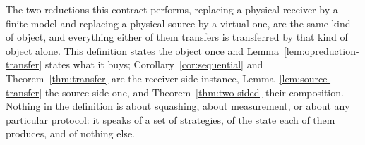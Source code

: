 
The two reductions this contract performs, replacing a physical receiver by a
finite model and replacing a physical source by a virtual one, are the same
kind of object, and everything either of them transfers is transferred by that
kind of object alone. This definition states the object once and
Lemma~\ref{lem:opreduction-transfer} states what it buys;
Corollary~\ref{cor:sequential} and Theorem~\ref{thm:transfer} are the
receiver-side instance, Lemma~\ref{lem:source-transfer} the source-side one,
and Theorem~\ref{thm:two-sided} their composition. Nothing in the definition
is about squashing, about measurement, or about any particular protocol: it
speaks of a set of strategies, of the state each of them produces, and of
nothing else.

